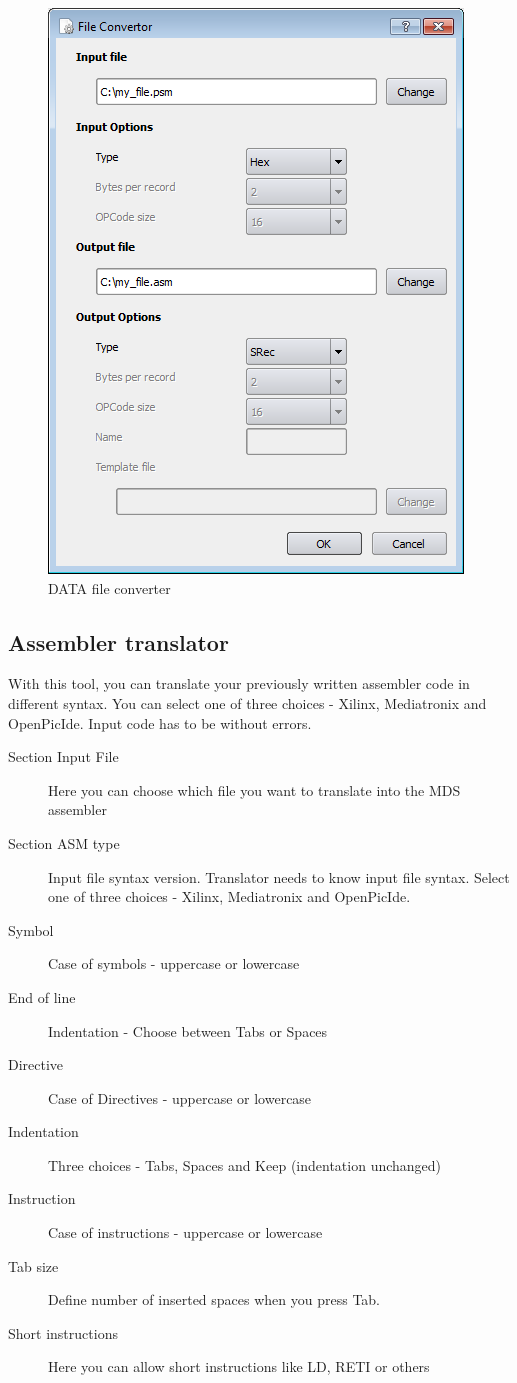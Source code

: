         \enlargethispage{6\baselineskip}
        \begin{figure}[h]
            \centering
            \includegraphics[width=.5\textwidth]{img/DATA_converter.png}
            \caption{DATA file converter}
        \end{figure}

    \clearpage
    \subsection{Assembler translator}
        With this tool, you can translate your previously written assembler code in different syntax.
        You can select one of three choices - Xilinx, Mediatronix and OpenPicIde. Input code has to be without
        errors.
        \begin{description}
            \item[Section Input File] Here you can choose which file you want to translate into the MDS assembler
            \item[Section ASM type] Input file syntax version. Translator needs to know input file syntax. Select one of
                three choices - Xilinx, Mediatronix and OpenPicIde.
            \item[Symbol] Case of symbols - uppercase or lowercase
            \item[End of line] Indentation - Choose between Tabs or Spaces
            \item[Directive] Case of Directives - uppercase or lowercase
            \item[Indentation] Three choices - Tabs, Spaces and Keep (indentation unchanged)
            \item[Instruction] Case of instructions - uppercase or lowercase
            \item[Tab size]  Define number of inserted spaces when you press Tab.
            \item[Short instructions] Here you can allow short instructions like LD, RETI or others
        \end{description}

